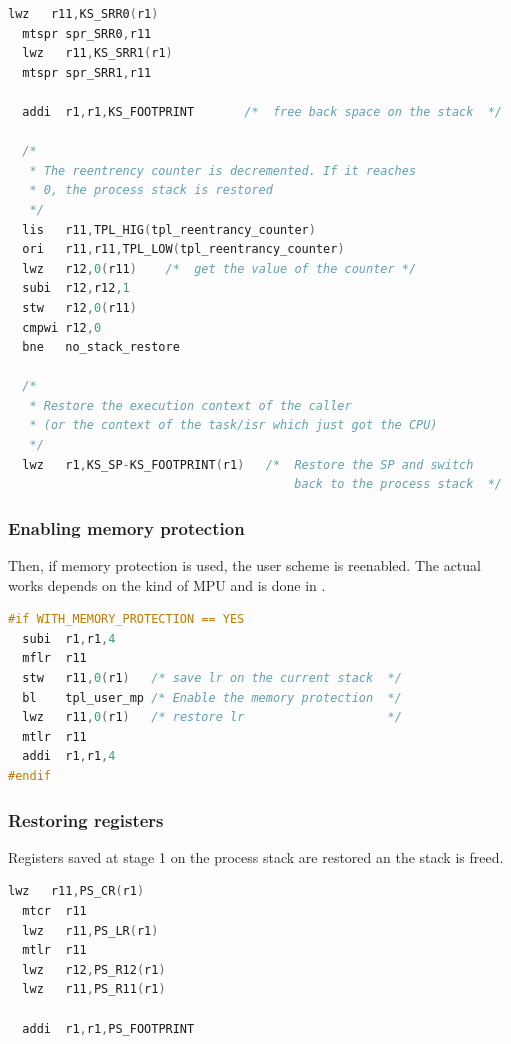 \begin{lstlisting}[language=C]
  lwz   r11,KS_SRR0(r1)
  mtspr spr_SRR0,r11
  lwz   r11,KS_SRR1(r1)
  mtspr spr_SRR1,r11

  addi  r1,r1,KS_FOOTPRINT       /*  free back space on the stack  */
  
  /*
   * The reentrency counter is decremented. If it reaches
   * 0, the process stack is restored
   */
  lis   r11,TPL_HIG(tpl_reentrancy_counter)
  ori   r11,r11,TPL_LOW(tpl_reentrancy_counter)
  lwz   r12,0(r11)    /*  get the value of the counter */
  subi  r12,r12,1
  stw   r12,0(r11)
  cmpwi r12,0
  bne   no_stack_restore

  /* 
   * Restore the execution context of the caller
   * (or the context of the task/isr which just got the CPU)
   */
  lwz   r1,KS_SP-KS_FOOTPRINT(r1)   /*  Restore the SP and switch
                                        back to the process stack  */
\end{lstlisting}

\subsubsection{Enabling memory protection}

Then, if memory protection is used, the user scheme is reenabled. The actual works depends on the kind of MPU and is done in .

\begin{lstlisting}[language=C]
#if WITH_MEMORY_PROTECTION == YES
  subi  r1,r1,4
  mflr  r11
  stw   r11,0(r1)   /* save lr on the current stack  */
  bl    tpl_user_mp /* Enable the memory protection  */
  lwz   r11,0(r1)   /* restore lr                    */
  mtlr  r11
  addi  r1,r1,4
#endif
\end{lstlisting}

\subsubsection{Restoring registers}

Registers saved at stage 1 on the process stack are restored an the stack is freed.

\begin{lstlisting}[language=C]
  lwz   r11,PS_CR(r1)
  mtcr  r11
  lwz   r11,PS_LR(r1)
  mtlr  r11
  lwz   r12,PS_R12(r1)
  lwz   r11,PS_R11(r1)

  addi  r1,r1,PS_FOOTPRINT
\end{lstlisting}

